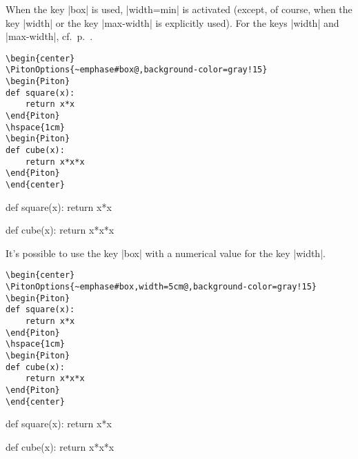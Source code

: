 \documentclass{article}
\begin{document}
When the  key |box| is used, |width=min| is activated (except, of course, when the
key |width| or the key |max-width| is explicitly used). For the keys |width| and
|max-width|, cf.~p.~\pageref{width}.


\smallskip
\begin{Verbatim}
\begin{center}
\PitonOptions{~emphase#box@,background-color=gray!15}
\begin{Piton}
def square(x):
    return x*x
\end{Piton}
\hspace{1cm}
\begin{Piton}
def cube(x):
    return x*x*x
\end{Piton}
\end{center}
\end{Verbatim}

\begin{center}
\begin{Piton}
def square(x):
    return x*x
\end{Piton}
\hspace{1cm}
\begin{Piton}
def cube(x):
    return x*x*x
\end{Piton}
\end{center}

\vspace{1cm}
It's possible to use the key |box| with a numerical value for the key |width|.


\smallskip

\begin{Verbatim}
\begin{center}
\PitonOptions{~emphase#box,width=5cm@,background-color=gray!15}
\begin{Piton}
def square(x):
    return x*x
\end{Piton}
\hspace{1cm}
\begin{Piton}
def cube(x):
    return x*x*x
\end{Piton}
\end{center}
\end{Verbatim}

\begin{center}
\begin{Piton}
def square(x):
    return x*x
\end{Piton}
\hspace{1cm}
\begin{Piton}
def cube(x):
    return x*x*x
\end{Piton}
\end{center}
\end{document}
